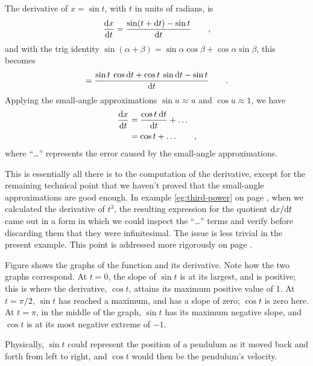 \begin{eg}\label{eg:derivative-of-sin}
The derivative of $x=\sin t$, with $t$ in units of radians, is
\begin{equation*}
  \frac{\textup{d} x}{\textup{d} t} = \frac{\sin(t+\textup{d} t)-\sin t}{\textup{d} t} \qquad , 
\end{equation*}
and with the trig identity $\sin(\alpha+\beta)=\sin\alpha\cos\beta+\cos\alpha\sin\beta$, this becomes
\begin{equation*}
                        = \frac{\sin t \: \cos \textup{d} t + \cos t \: \sin \textup{d} t - \sin t}{\textup{d} t} \qquad .
\end{equation*}
Applying the small-angle approximations $\sin u\approx u$ and $\cos u\approx 1$,
we have
\begin{align*}
\frac{\textup{d} x}{\textup{d} t}   &= \frac{\cos t \: \textup{d} t}{\textup{d} t} + \ldots\\
                        &= \cos t + \ldots \qquad ,
\end{align*}
where ``\ldots'' represents the error caused by the small-angle approximations.

This is essentially all there is to the computation of the derivative, except for the remaining technical
point that we haven't proved that the small-angle approximations are good enough. In example \ref{eg:third-power} on page \pageref{eg:third-power},
when we calculated the derivative of $t^3$, the resulting expression for the quotient $\textup{d} x/\textup{d} t$
came out in a form in which we could inspect the ``\ldots'' terms and verify before discarding them that they were infinitesimal.
The issue is less trivial in the present example.
This point is addressed more rigorously on page \pageref{detour:sin-rigor}.

Figure  shows the graphs of the function and its derivative. Note how the two
graphs correspond. At $t=0$, the slope of $\sin t$ is at its largest, and is positive; this is where
the derivative, $\cos t$, attains its maximum positive value of 1. At $t=\pi/2$, $\sin t$ has reached
a maximum, and has a slope of zero; $\cos t$ is zero here. At $t=\pi$, in the middle of the graph,
$\sin t$ has its maximum negative slope, and $\cos t$ is at its most negative extreme of $-1$.

Physically, $\sin t$ could represent the position of a pendulum as it moved back and forth from left
to right, and $\cos t$ would then be the pendulum's velocity.
\end{eg}

